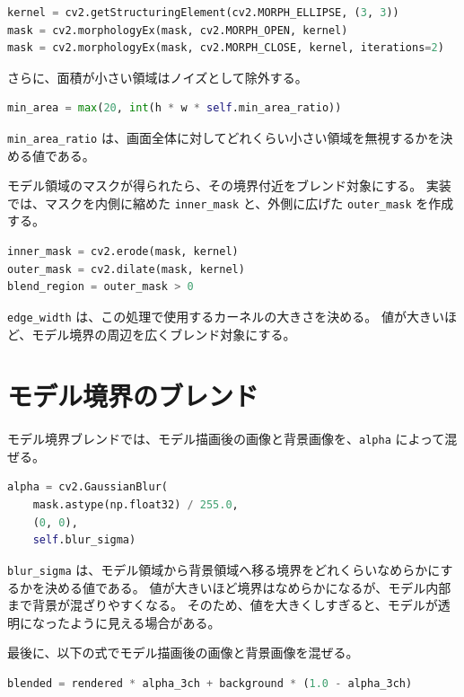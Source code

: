 \documentclass[uplatex,dvipdfmx]{jsarticle}
\begin{document}
\begin{lstlisting}[language=Python]
kernel = cv2.getStructuringElement(cv2.MORPH_ELLIPSE, (3, 3))
mask = cv2.morphologyEx(mask, cv2.MORPH_OPEN, kernel)
mask = cv2.morphologyEx(mask, cv2.MORPH_CLOSE, kernel, iterations=2)
\end{lstlisting}

さらに、面積が小さい領域はノイズとして除外する。

\begin{lstlisting}[language=Python]
min_area = max(20, int(h * w * self.min_area_ratio))
\end{lstlisting}

\texttt{min\_area\_ratio} は、画面全体に対してどれくらい小さい領域を無視するかを決める値である。

モデル領域のマスクが得られたら、その境界付近をブレンド対象にする。
実装では、マスクを内側に縮めた \texttt{inner\_mask} と、外側に広げた \texttt{outer\_mask} を作成する。

\begin{lstlisting}[language=Python]
inner_mask = cv2.erode(mask, kernel)
outer_mask = cv2.dilate(mask, kernel)
blend_region = outer_mask > 0
\end{lstlisting}

\texttt{edge\_width} は、この処理で使用するカーネルの大きさを決める。
値が大きいほど、モデル境界の周辺を広くブレンド対象にする。

\section{モデル境界のブレンド}

モデル境界ブレンドでは、モデル描画後の画像と背景画像を、\texttt{alpha} によって混ぜる。

\begin{lstlisting}[language=Python]
alpha = cv2.GaussianBlur(
    mask.astype(np.float32) / 255.0,
    (0, 0),
    self.blur_sigma)
\end{lstlisting}

\texttt{blur\_sigma} は、モデル領域から背景領域へ移る境界をどれくらいなめらかにするかを決める値である。
値が大きいほど境界はなめらかになるが、モデル内部まで背景が混ざりやすくなる。
そのため、値を大きくしすぎると、モデルが透明になったように見える場合がある。

最後に、以下の式でモデル描画後の画像と背景画像を混ぜる。

\begin{lstlisting}[language=Python]
blended = rendered * alpha_3ch + background * (1.0 - alpha_3ch)
\end{lstlisting}
\end{document}
